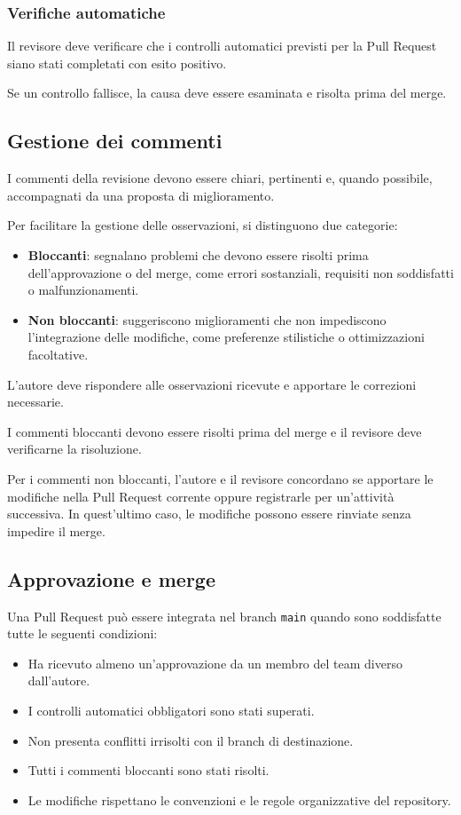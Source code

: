 \documentclass[11pt, a4paper]{article}
\begin{document}
\subsubsection{Verifiche automatiche}

Il revisore deve verificare che i controlli automatici previsti per la Pull Request siano stati completati con esito positivo.

Se un controllo fallisce, la causa deve essere esaminata e risolta prima del merge.

\subsection{Gestione dei commenti}

I commenti della revisione devono essere chiari, pertinenti e, quando possibile, accompagnati da una proposta di miglioramento.

Per facilitare la gestione delle osservazioni, si distinguono due categorie:
\begin{itemize}
    \item \textbf{Bloccanti}: segnalano problemi che devono essere risolti prima dell'approvazione o del merge, come errori sostanziali, requisiti non soddisfatti o malfunzionamenti.
    \item \textbf{Non bloccanti}: suggeriscono miglioramenti che non impediscono l'integrazione delle modifiche, come preferenze stilistiche o ottimizzazioni facoltative.
\end{itemize}

\noindent L'autore deve rispondere alle osservazioni ricevute e apportare le correzioni necessarie.

I commenti bloccanti devono essere risolti prima del merge e il revisore deve verificarne la risoluzione.

Per i commenti non bloccanti, l'autore e il revisore concordano se apportare le modifiche nella Pull Request corrente oppure registrarle per un'attività successiva. In quest'ultimo caso, le modifiche possono essere rinviate senza impedire il merge.

\subsection{Approvazione e merge}
\label{subsec:approvazione-e-merge}

Una Pull Request può essere integrata nel branch \texttt{main} quando sono soddisfatte tutte le seguenti condizioni:
\begin{itemize}
    \item Ha ricevuto almeno un'approvazione da un membro del team diverso dall'autore.
    \item I controlli automatici obbligatori sono stati superati.
    \item Non presenta conflitti irrisolti con il branch di destinazione.
    \item Tutti i commenti bloccanti sono stati risolti.
    \item Le modifiche rispettano le convenzioni e le regole organizzative del repository.
\end{itemize}
\end{document}
